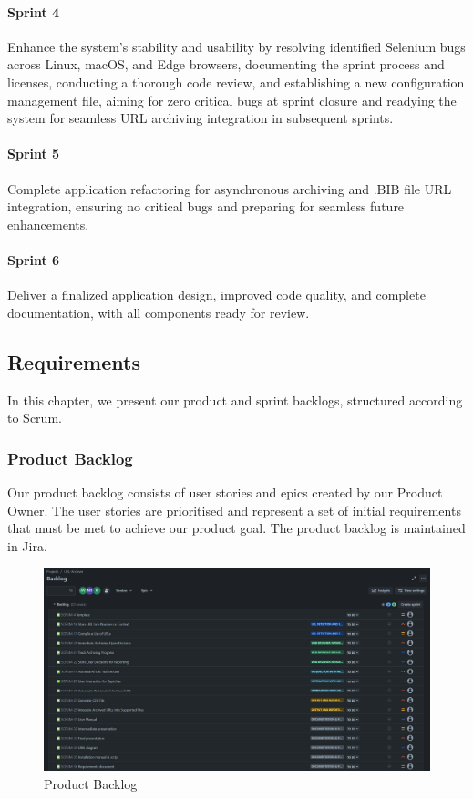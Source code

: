 \paragraph{Sprint 4}
Enhance the system's stability and usability by resolving identified Selenium bugs across Linux, macOS, and Edge browsers, documenting the sprint process and licenses, conducting a thorough code review, and establishing a new configuration management file, aiming for zero critical bugs at sprint closure and readying the system for seamless URL archiving integration in subsequent sprints.

\paragraph{Sprint 5}
Complete application refactoring for asynchronous archiving and .BIB file URL integration, ensuring no critical bugs and preparing for seamless future enhancements.

\paragraph{Sprint 6}
Deliver a finalized application design, improved code quality, and complete documentation, with all components ready for review.

\clearpage

\subsection{Requirements}
In this chapter, we present our product and sprint backlogs, structured according to Scrum.

\subsubsection{Product Backlog}
Our product backlog consists of user stories and epics created by our Product Owner.
The user stories are prioritised and represent a set of initial requirements that must be met to achieve our product goal. The product backlog is maintained in Jira.
\begin{figure}[h!]
    \centering
    \includegraphics[width=1\textwidth]{pictures/backlog}
    \caption{Product Backlog}
    \label{fig:backlog}
\end{figure}

